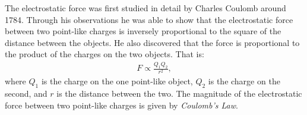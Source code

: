 The electrostatic force was first studied in detail by
Charles Coulomb around 1784. Through his observations he was able
to show that the electrostatic force between two point-like
charges is inversely proportional to the square of the distance
between the objects. He also discovered that the force is
proportional to the product of the charges on the two objects. That is:\\

\begin{eqnarray*}
F \propto \frac{Q_1 Q_2}{r^2},
\end{eqnarray*}
where $Q_1$ is the charge on the one point-like object, $Q_2$ is
the charge on the second, and $r$ is the distance between the two.
The magnitude of the electrostatic force between two point-like
charges is given by \textit{Coulomb's Law}.\\


